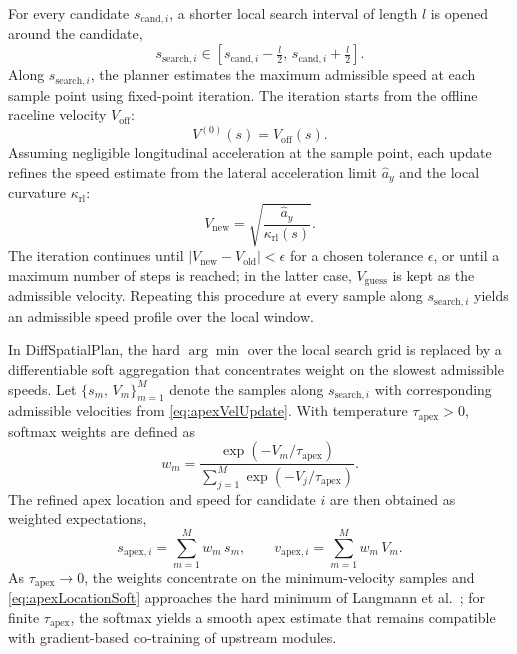 For every candidate $s_{\text{cand},i}$, a shorter local search interval of length $l$ is opened around the candidate,
\begin{equation}
    s_{\text{search},i} \in \left[s_{\text{cand},i} - \tfrac{l}{2},\, s_{\text{cand},i} + \tfrac{l}{2}\right].
    \label{eq:apexSearchInterval}
\end{equation}
Along $s_{\text{search}, i}$, the planner estimates the maximum admissible speed at each sample point using fixed-point iteration.
The iteration starts from the offline raceline velocity $V_{\text{off}}$:
\begin{equation}
    V^{(0)}(s) = V_{\text{off}}(s).
    \label{eq:apexVelGuess}
\end{equation}
Assuming negligible longitudinal acceleration at the sample point, each update refines the speed estimate from the lateral acceleration limit $\hat{a}_y$ and the local curvature $\kappa_{\text{rl}}$:
\begin{equation}
    V_{\text{new}} = \sqrt{\frac{\hat{a}_y}{\kappa_{\text{rl}}(s)}}.
    \label{eq:apexVelUpdate}
\end{equation}
The iteration continues until $|V_{\text{new}} - V_{\text{old}}| < \epsilon$ for a chosen tolerance $\epsilon$, or until a maximum number of steps is reached; in the latter case, $V_{\text{guess}}$ is kept as the admissible velocity.
Repeating this procedure at every sample along $s_{\text{search},i}$ yields an admissible speed profile over the local window.

In DiffSpatialPlan, the hard $\arg\min$ over the local search grid is replaced by a differentiable soft aggregation that concentrates weight on the slowest admissible speeds.
Let $\{s_m,\, V_m\}_{m=1}^{M}$ denote the samples along $s_{\text{search},i}$ with corresponding admissible velocities from \eqref{eq:apexVelUpdate}.
With temperature $\tau_{\text{apex}} > 0$, softmax weights are defined as
\begin{equation}
    w_m = \frac{\exp\!\left(-V_m / \tau_{\text{apex}}\right)}{\sum_{j=1}^{M} \exp\!\left(-V_j / \tau_{\text{apex}}\right)}.
    \label{eq:apexSoftmax}
\end{equation}
The refined apex location and speed for candidate $i$ are then obtained as weighted expectations,
\begin{equation}
    s_{\text{apex},i} = \sum_{m=1}^{M} w_m\, s_m,
    \qquad
    v_{\text{apex},i} = \sum_{m=1}^{M} w_m\, V_m.
    \label{eq:apexLocationSoft}
\end{equation}
As $\tau_{\text{apex}} \to 0$, the weights concentrate on the minimum-velocity samples and \eqref{eq:apexLocationSoft} approaches the hard minimum of Langmann et al.\ \cite{langmann_OnlineVelocityProfile_2025}; for finite $\tau_{\text{apex}}$, the softmax yields a smooth apex estimate that remains compatible with gradient-based co-training of upstream modules.

